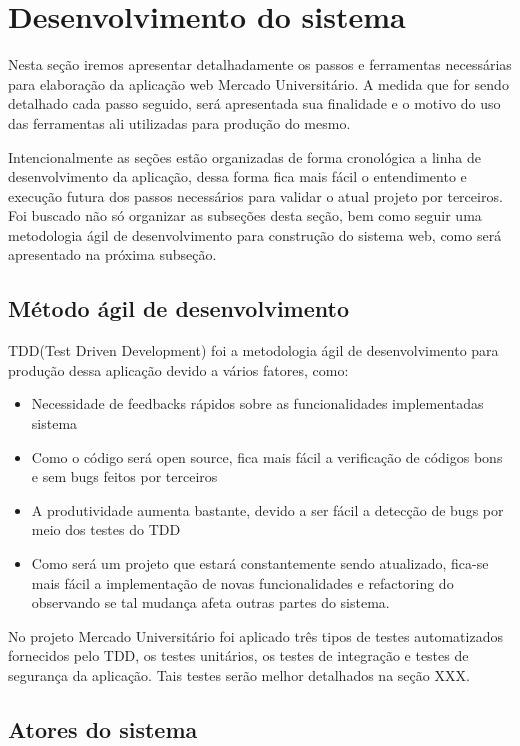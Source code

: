 \chapter{Desenvolvimento do sistema}
\label{chap:etapas_desenvolvimento}

Nesta seção iremos apresentar detalhadamente os passos e ferramentas necessárias para elaboração da aplicação web Mercado Universitário. A medida que for sendo detalhado cada passo seguido, será apresentada sua finalidade e o motivo do uso das ferramentas ali utilizadas para produção do mesmo. \par
Intencionalmente as seções estão organizadas de forma cronológica a linha de desenvolvimento da aplicação, dessa forma fica mais fácil o entendimento e execução futura dos passos necessários para validar o atual projeto por terceiros. Foi buscado não só organizar as subseções desta seção, bem como seguir uma metodologia ágil de desenvolvimento para construção do sistema web, como será apresentado na próxima subseção.

\section{Método ágil de desenvolvimento}

TDD(Test Driven Development) foi a metodologia ágil de desenvolvimento para produção dessa aplicação devido a vários fatores, como:
\begin{itemize}  
\item Necessidade de feedbacks rápidos sobre as funcionalidades implementadas sistema
\item Como o código será open source, fica mais fácil a verificação de códigos bons e sem bugs feitos por terceiros
\item A produtividade aumenta bastante, devido a ser fácil a detecção de bugs por meio dos testes do TDD
\item Como será um projeto que estará constantemente sendo atualizado, fica-se mais fácil a implementação de novas funcionalidades e refactoring do observando se tal mudança afeta outras partes do sistema.
\end{itemize}
No projeto Mercado Universitário foi aplicado três tipos de testes automatizados fornecidos pelo TDD, os testes unitários, os testes de integração e testes de segurança da aplicação. Tais testes serão melhor detalhados na seção XXX.

\section{Atores do sistema}

